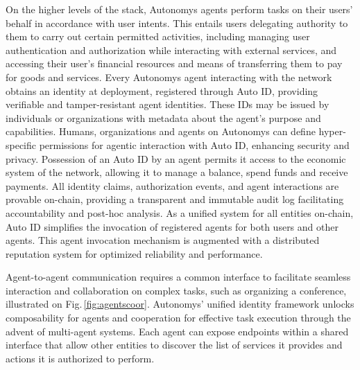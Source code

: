 \documentclass[conference]{IEEEtran}
\begin{document}
On the higher levels of the stack, Autonomys agents perform tasks on their users' behalf in accordance with user intents. This entails users delegating authority to them to carry out certain permitted activities, including managing user authentication and authorization while interacting with external services, and
accessing their user's financial resources and means of transferring them to pay for goods and services. Every Autonomys agent interacting with the network obtains an identity at deployment, registered through Auto ID, providing verifiable and tamper-resistant agent identities. These IDs may be issued by individuals or organizations with metadata about the agent's purpose and capabilities. Humans, organizations and agents on Autonomys can define hyper-specific permissions for agentic interaction with Auto ID, enhancing security and privacy. Possession of an Auto ID by an agent permits it access to the economic system of the network, allowing it to manage a balance, spend funds and receive payments. All identity claims, authorization events, and agent interactions are provable on-chain, providing a transparent and immutable audit log facilitating accountability and post-hoc analysis. As a unified system for all entities on-chain, Auto ID simplifies the invocation of registered agents for both users and other agents. This agent invocation mechanism is augmented with a distributed reputation system for optimized reliability and performance.

Agent-to-agent communication requires a common interface to facilitate seamless interaction and collaboration on complex tasks, such as organizing a conference, illustrated on Fig.\,\ref{fig:agentscoor}. Autonomys' unified identity framework unlocks composability for agents and cooperation for effective task execution through the advent of multi-agent systems. Each agent can expose endpoints within a shared interface that allow other entities to discover the list of services it provides and actions it is authorized to perform.
\end{document}
